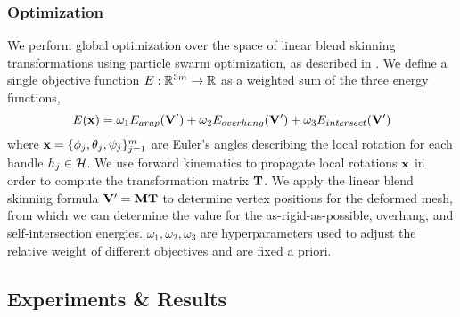 







\subsubsection*{Optimization}

We perform global optimization over the space of linear blend skinning transformations using particle swarm optimization, as described in \cite{jacobson_matryoshka_2017}. We define a single objective function $E: \mathbb{R}^{3m} \to \mathbb{R}$ as a weighted sum of the three energy functions,
\[
    E(\mathbf{x}) = \omega_1 E_{arap}(\mathbf{V}') + \omega_2 E_{overhang}(\mathbf{V}') + \omega_3 E_{intersect}(\mathbf{V}')
\]
where $\mathbf{x} = \{ \phi_j, \theta_j, \psi_j \}_{j=1}^m$ are Euler's angles describing the local rotation for each handle $h_j \in \mathcal{H}$. We use forward kinematics to propagate local rotations $\mathbf{x}$ in order to compute the transformation matrix $\mathbf{T}$. We apply the linear blend skinning formula $\mathbf{V}' = \mathbf{M} \mathbf{T}$ to determine vertex positions for the deformed mesh, from which we can determine the value for the as-rigid-as-possible, overhang, and self-intersection energies. $\omega_1,\omega_2,\omega_3$ are hyperparameters used to adjust the relative weight of different objectives and are fixed a priori.

\subsection*{Experiments \& Results}


